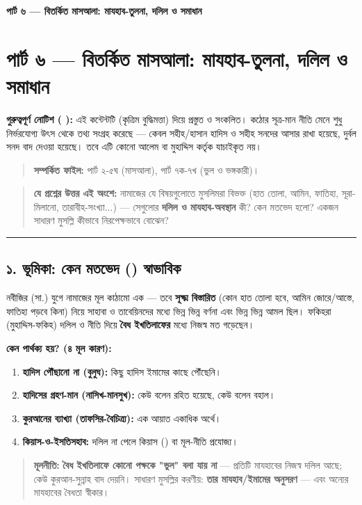 

\begin{center}{\Large\bfseries\color{emerald} পার্ট ৬ — বিতর্কিত মাসআলা: মাযহাব-তুলনা, দলিল ও সমাধান}\end{center}
\vspace{1em}
\section*{পার্ট ৬ — বিতর্কিত মাসআলা: মাযহাব-তুলনা, দলিল ও সমাধান}

\begin{warnbox}
 \textbf{গুরুত্বপূর্ণ নোটিশ ( ):} এই কন্টেন্টটি  (কৃত্রিম বুদ্ধিমত্তা) দিয়ে প্রস্তুত ও সংকলিত।  কঠোর সূত্র-মান নীতি মেনে শুধু নির্ভরযোগ্য উৎস থেকে তথ্য সংগ্রহ করেছে — কেবল সহীহ/হাসান হাদিস ও সহীহ সনদের আসার রাখা হয়েছে, দুর্বল সনদ বাদ দেওয়া হয়েছে। তবে এটি কোনো আলেম বা মুহাদ্দিস কর্তৃক যাচাইকৃত নয়।
\end{warnbox}

\begin{quote}
\textbf{সম্পর্কিত ফাইল:} পার্ট ২-৫ঘ (মাসআলা), পার্ট ৭ক-৭খ (ভুল ও ভঙ্গকারী)।
\end{quote}

\begin{quote}
\textbf{যে প্রশ্নের উত্তর এই অংশে:} নামাজের যে বিষয়গুলোতে মুসলিমরা বিভক্ত (হাত তোলা, আমিন, ফাতিহা, সূরা-মিলানো, তারাবীহ-সংখ্যা...) — সেগুলোর \textbf{দলিল ও মাযহাব-অবস্থান} কী? কেন মতভেদ হলো? একজন সাধারণ মুসল্লি কীভাবে নিরপেক্ষভাবে বোঝেন?
\end{quote}

\medskip\hrule\medskip

\subsection*{১. ভূমিকা: কেন মতভেদ () স্বাভাবিক}

নবীজির (সা.) যুগে নামাজের মূল কাঠামো এক — তবে \textbf{সূক্ষ্ম বিস্তারিত} (কোন হাত তোলা হবে, আমিন জোরে/আস্তে, ফাতিহা পড়বে কিনা) নিয়ে সাহাবা ও তাবেয়িনদের মধ্যে ভিন্ন ভিন্ন বর্ণনা এবং ভিন্ন ভিন্ন আমল ছিল। ফকিহরা (মুহাদ্দিস-ফকিহ) দলিল ও নীতি দিয়ে \textbf{বৈধ ইখতিলাফের} মধ্যে নিজস্ব মত গড়েছেন।

\textbf{কেন পার্থক্য হয়? (৪ মূল কারণ):}
\begin{enumerate}
\item \textbf{হাদিস পৌঁছানো না (বুলুঘ):} কিছু হাদিস ইমামের কাছে পৌঁছেনি।
\item \textbf{হাদিসের গ্রহণ-মান (নাসিখ-মানসুখ):} কেউ বলেন রহিত হয়েছে, কেউ বলেন বহাল।
\item \textbf{কুরআনের ব্যাখ্যা (তাফসির-বৈচিত্র্য):} এক আয়াত একাধিক অর্থে।
\item \textbf{কিয়াস-ও-ইসতিসহাব:} দলিল না পেলে কিয়াস () বা মূল-নীতি প্রযোজ্য।
\end{enumerate}
\begin{quote}
\textbf{মূলনীতি:} \textbf{বৈধ ইখতিলাফে কোনো পক্ষকে "ভুল" বলা যায় না} — প্রতিটি মাযহাবের নিজস্ব দলিল আছে; কেউ কুরআন-সুন্নাহ বাদ দেয়নি। সাধারণ মুসল্লির করণীয়: \textbf{তার মাযহাব/ইমামের অনুসরণ} — এবং অন্যের মাযহাবের বৈধতা স্বীকার।
\end{quote}

